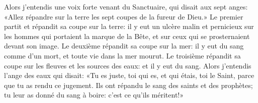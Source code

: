 Alors j’entendis une voix forte venant du Sanctuaire,
	qui disait aux sept anges:
	«Allez répandre sur la terre les sept coupes de la fureur de Dieu.»
Le premier partit et répandit sa coupe sur la terre:
	il y eut un ulcère malin et pernicieux
		sur les hommes qui portaient la marque de la Bête,
	et sur ceux qui se prosternaient devant son image.
Le deuxième répandit sa coupe sur la mer:
	il y eut du sang comme d’un mort, et toute vie dans la mer mourut.
Le troisième répandit sa coupe sur les fleuves et les sources des eaux:
	et il y eut du sang.
Alors j’entendis l’ange des eaux qui disait:
	«Tu es juste, toi qui es, et qui étais, toi le Saint,
	parce que tu as rendu ce jugement.
	Ils ont répandu le sang des saints et des prophètes;
	tu leur as donné du sang à boire: c’est ce qu’ils méritent!»
